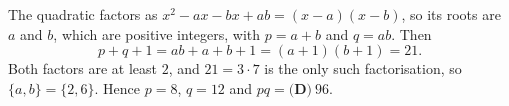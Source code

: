 The quadratic factors as $x^2-ax-bx+ab=(x-a)(x-b)$, so its roots are $a$ and $b$, which are positive integers, with $p=a+b$ and $q=ab$. Then
\[
p+q+1=ab+a+b+1=(a+1)(b+1)=21 .
\]
Both factors are at least $2$, and $21=3\cdot7$ is the only such factorisation, so $\{a,b\}=\{2,6\}$. Hence $p=8$, $q=12$ and $pq=\boxed{\textbf{(D)}\ 96}$.
